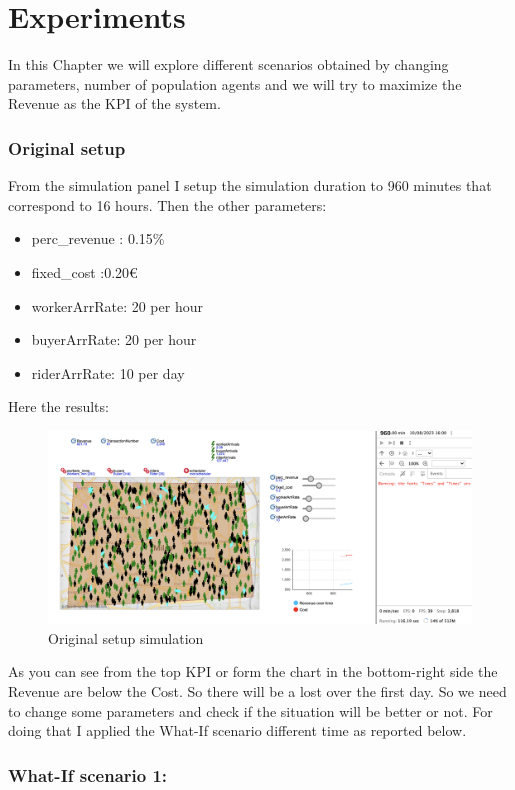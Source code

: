 \chapter{Experiments} \label{ch:experiments}
In this Chapter we will explore different scenarios obtained by changing parameters, number of population agents and we will try to maximize the Revenue as the KPI of the system.
\subsection{Original setup}
From the simulation panel I setup the simulation duration to 960 minutes that correspond to 16 hours. Then the other parameters:
\begin{itemize}
\item perc\_revenue : 0.15\%
\item fixed\_cost :0.20€
\item workerArrRate: 20 per hour
\item buyerArrRate: 20 per hour
\item riderArrRate: 10 per day
\end{itemize}
Here the results:
\begin{figure}[hbtp]
\caption{Original setup simulation}
\centering
\includegraphics[scale=0.3]{../Images/sim01.png}
\end{figure}
As you can see from the top KPI or form the chart in the bottom-right side the Revenue are below the Cost. So there will be a lost over the first day. So we need to change some parameters and check if the situation will be better or not. For doing that I applied the What-If scenario different time as reported below.
\subsection{What-If scenario 1: }